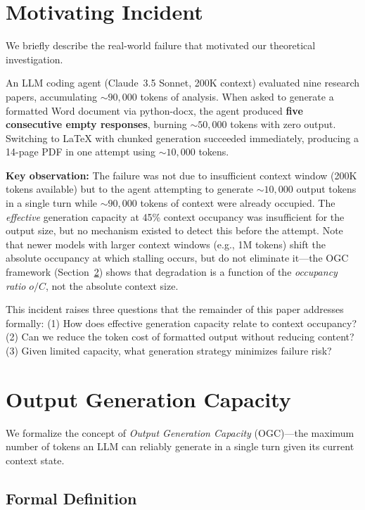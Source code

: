 \documentclass[11pt,twocolumn]{article}
\begin{document}
\section{Motivating Incident}
\label{sec:incident}

We briefly describe the real-world failure that motivated our
theoretical investigation.

An LLM coding agent (Claude~3.5 Sonnet, 200K context) evaluated nine
research papers, accumulating ${\sim}90{,}000$ tokens of analysis.
When asked to generate a formatted Word document via python-docx,
the agent produced \textbf{five consecutive empty responses},
burning ${\sim}50{,}000$ tokens with zero output.  Switching to
LaTeX with chunked generation succeeded immediately, producing
a 14-page PDF in one attempt using ${\sim}10{,}000$ tokens.

\textbf{Key observation:} The failure was not due to insufficient
context window (200K tokens available) but to the agent attempting
to generate ${\sim}10{,}000$ output tokens in a single turn while
${\sim}90{,}000$ tokens of context were already occupied.  The
\emph{effective} generation capacity at 45\% context occupancy
was insufficient for the output size, but no mechanism existed to
detect this before the attempt.
Note that newer models with larger context windows (e.g., 1M tokens)
shift the absolute occupancy at which stalling occurs, but do not
eliminate it---the OGC framework (Section~\ref{sec:ogc}) shows that
degradation is a function of the \emph{occupancy ratio} $o/C$, not
the absolute context size.

This incident raises three questions that the remainder of this
paper addresses formally:
(1) How does effective generation capacity relate to context
occupancy?
(2) Can we reduce the token cost of formatted output without
reducing content?
(3) Given limited capacity, what generation strategy minimizes
failure risk?

\section{Output Generation Capacity}
\label{sec:ogc}

We formalize the concept of \emph{Output Generation Capacity}
(OGC)---the maximum number of tokens an LLM can reliably generate
in a single turn given its current context state.

\subsection{Formal Definition}
\end{document}
